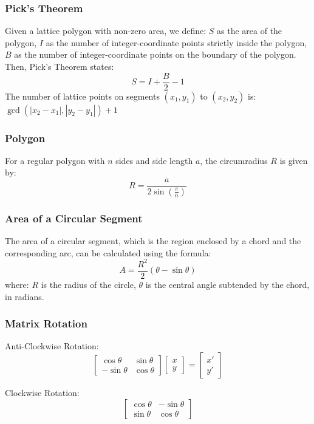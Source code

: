 \subsubsection{Pick's Theorem}
Given a lattice polygon with non-zero area, we define: $S$ as the area of the polygon, $I$ as the number of integer-coordinate points strictly inside the polygon, $B$ as the number of integer-coordinate points on the boundary of the polygon.
Then, Pick's Theorem states: $$S=I+\frac{B}{2}-1$$
The number of lattice points on segments $(x_1, y_1)$ to $(x_2 , y_2)$ is: $\gcd(|x_2 - x_1| , |y_2 - y_1|) + 1$

\subsubsection{Polygon}
For a regular polygon with \( n \) sides and side length \( a \), the circumradius \( R \) is given by:
\[
  R = \frac{a}{2 \sin\left(\frac{\pi}{n}\right)}
\]

\subsubsection{Area of a Circular Segment}
The area of a circular segment, which is the region enclosed by a chord and the corresponding arc, can be calculated using the formula:
\[
  A = \frac{R^2}{2} \left(\theta - \sin\theta\right)
\]
where:
\( R \) is the radius of the circle,
\( \theta \) is the central angle subtended by the chord, in radians.

\subsubsection{Matrix Rotation}
Anti-Clockwise Rotation:
$$
\begin{bmatrix}
\cos \theta & \sin \theta \\
-\sin \theta & \cos \theta
\end{bmatrix}
\begin{bmatrix}
x \\
y
\end{bmatrix}
=
\begin{bmatrix}
x' \\
y'
\end{bmatrix}
$$

Clockwise Rotation:
$$
\begin{bmatrix}
\cos \theta & -\sin \theta \\
\sin \theta & \cos \theta
\end{bmatrix}
$$

